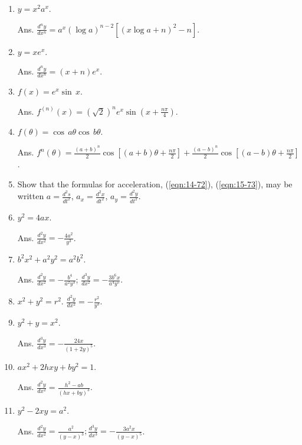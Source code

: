 \begin{enumerate}
\addtocounter{enumi}{23}
\item
$y = x^2a^x$. 	 	

Ans.
$\frac{d^n y}{dx^n} = a^x (\log a)^{n - 2} [(x \log a + n)^2 - n]$.

\item
$y = xe^x$. 	 	

Ans.
$\frac{d^n y}{dx^n} = (x + n)e^x$.

\item
$f(x) = e^x\sin\, x$. 	 	

Ans.
$f^{(n)}(x) = (\sqrt{2})^n e^x \sin \left ( x + \frac{n\pi}{4} \right )$.

\item
$f(\theta) = \cos\,a\theta\cos\,b\theta$.  	

Ans.	
$f^{n}(\theta) 
= \frac{(a + b)^n}{2} \cos \left [ (a + b)\theta + \frac{n\pi}{2} \right ]
+ \frac{(a - b)^n}{2} \cos \left [ (a - b)\theta + \frac{n\pi}{2} \right ]$.

\item
Show that the formulas for acceleration, 
(\ref{eqn:14-72}), (\ref{eqn:15-73}), %
may be written
$a = \frac{d^2 s}{dt^2}$, 
$a_x = \frac{d^2 x}{dt^2}$, 
$a_y = \frac{d^2 y}{dt^2}$.

\item
$y^2 = 4ax$.  	

Ans.
$\frac{d^2 y}{dx^2} = -\frac{4a^2}{y^3}$.

\item
$b^2x^2 + a^2y^2 = a^2b^2$.  	

Ans.	
$\frac{d^2 y}{dx^2} = -\frac{b^4}{a^2 y^3}$; 
$\frac{d^3 y}{dx^2} = -\frac{3b^6 x}{a^4 y^5}$.

\item
$x^2 + y^2 = r^2$. 	
$\frac{d^2 y}{dx^2} = -\frac{r^2}{y^3}$.

\item
$y^2 + y = x^2$. 	

Ans.
$\frac{d^3 y}{dx^3} = -\frac{24x}{(1 + 2y)^5}$.

\item
$ax^2 + 2hxy + by^2 = 1$.  	

Ans.	
$\frac{d^2 y}{dx^2} = \frac{h^2 - ab}{(hx + by)^3}$.

\item
$y^2 - 2xy = a^2$.  	

Ans.
$\frac{d^2 y}{dx^2} 
= \frac{a^2}{(y - x)^3}; \frac{d^3 y}{dx^3} = -\frac{3a^2 x}{(y - x)^5}$.


\end{enumerate}
